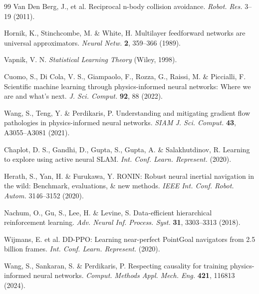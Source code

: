 \documentclass[pdflatex,sn-nature]{sn-jnl}%
\begin{document}
\begin{thebibliography}{99}
Van Den Berg, J., et al. Reciprocal n-body collision avoidance. \textit{Robot. Res.} 3--19 (2011).


Hornik, K., Stinchcombe, M. \& White, H. Multilayer feedforward networks are universal approximators. \textit{Neural Netw.} \textbf{2}, 359--366 (1989).

Vapnik, V. N. \textit{Statistical Learning Theory} (Wiley, 1998).



Cuomo, S., Di Cola, V. S., Giampaolo, F., Rozza, G., Raissi, M. \& Piccialli, F. Scientific machine learning through physics-informed neural networks: Where we are and what's next. \textit{J. Sci. Comput.} \textbf{92}, 88 (2022).

Wang, S., Teng, Y. \& Perdikaris, P. Understanding and mitigating gradient flow pathologies in physics-informed neural networks. \textit{SIAM J. Sci. Comput.} \textbf{43}, A3055--A3081 (2021).

Chaplot, D. S., Gandhi, D., Gupta, S., Gupta, A. \& Salakhutdinov, R. Learning to explore using active neural SLAM. \textit{Int. Conf. Learn. Represent.} (2020).

Herath, S., Yan, H. \& Furukawa, Y. {RONIN}: Robust neural inertial navigation in the wild: Benchmark, evaluations, \& new methods. \textit{IEEE Int. Conf. Robot. Autom.} 3146--3152 (2020).

Nachum, O., Gu, S., Lee, H. \& Levine, S. Data-efficient hierarchical reinforcement learning. \textit{Adv. Neural Inf. Process. Syst.} \textbf{31}, 3303--3313 (2018).

Wijmans, E. et al. {DD-PPO}: Learning near-perfect PointGoal navigators from 2.5 billion frames. \textit{Int. Conf. Learn. Represent.} (2020).


Wang, S., Sankaran, S. \& Perdikaris, P. Respecting causality for training physics-informed neural networks. \textit{Comput. Methods Appl. Mech. Eng.} \textbf{421}, 116813 (2024).


\end{thebibliography}
\end{document}
